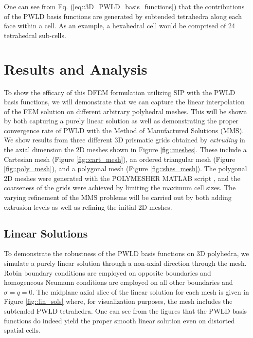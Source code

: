 \documentclass{anstrans}
\begin{document}
One can see from Eq. (\ref{eq::3D_PWLD_basis_functions}) that the contributions of the PWLD basis functions are generated by subtended tetrahedra along each face within a cell. As an example, a hexahedral cell would be comprised of 24 tetrahedral sub-cells.

\section{Results and Analysis}

To show the efficacy of this DFEM formulation utilizing SIP with the PWLD basis functions, we will demonstrate that we can capture the linear interpolation of the FEM solution on different arbitrary polyhedral meshes. This will be shown by both capturing a purely linear solution as well as demonstrating the proper convergence rate of PWLD with the Method of Manufactured Solutions (MMS). We show results from three different 3D prismatic grids obtained by {\em extruding} in the axial dimension the 2D meshes shown in Figure \ref{fig::meshes}. These include a Cartesian mesh (Figure \ref{fig::cart_mesh}), an ordered triangular mesh (Figure \ref{fig::poly_mesh}), and a polygonal mesh (Figure \ref{fig::shes_mesh}). The polygonal 2D meshes were generated with the POLYMESHER MATLAB script \cite{talischi2012polymesher}, and the coarseness of the grids were achieved by limiting the maximum cell sizes. The varying refinement of the MMS problems will be carried out by both adding extrusion levels as well as refining the initial 2D meshes.



\subsection{Linear Solutions}
\label{sec::Linear}

To demonstrate the robustness of the PWLD basis functions on 3D polyhedra, we simulate a purely linear solution through a non-axial direction through the mesh. Robin boundary conditions are employed on opposite boundaries and homogeneous Neumann conditions are employed on all other boundaries and $\sigma = q = 0$. The midplane axial slice of the linear solution for each mesh is given in Figure \ref{fig::lin_sols} where, for visualization purposes, the mesh includes the subtended PWLD tetrahedra. One can see from the figures that the PWLD basis functions do indeed yield the proper smooth linear solution even on distorted spatial cells.
\end{document}
